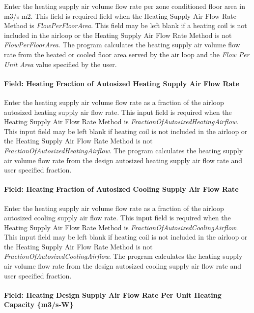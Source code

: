 Enter the heating supply air volume flow rate per zone conditioned floor area in m3/s-m2. This field is required field when the Heating Supply Air Flow Rate Method is \emph{FlowPerFloorArea}. This field may be left blank if a heating coil is not included in the airloop or the Heating Supply Air Flow Rate Method is not \emph{FlowPerFloorArea}. The program calculates the heating supply air volume flow rate from the heated or cooled floor area served by the air loop and the \emph{Flow Per Unit Area} value specified by the user.

\paragraph{Field: Heating Fraction of Autosized Heating Supply Air Flow Rate}\label{field-heating-fraction-of-autosized-heating-supply-air-flow-rate}

Enter the heating supply air volume flow rate as a fraction of the airloop autosized heating supply air flow rate. This input field is required when the Heating Supply Air Flow Rate Method is \emph{FractionOfAutosizedHeatingAirflow}. This input field may be left blank if heating coil is not included in the airloop or the Heating Supply Air Flow Rate Method is not \emph{FractionOfAutosizedHeatingAirflow}. The program calculates the heating supply air volume flow rate from the design autosized heating supply air flow rate and user specified fraction.

\paragraph{Field: Heating Fraction of Autosized Cooling Supply Air Flow Rate}\label{field-heating-fraction-of-autosized-cooling-supply-air-flow-rate}

Enter the heating supply air volume flow rate as a fraction of the airloop autosized cooling supply air flow rate. This input field is required when the Heating Supply Air Flow Rate Method is \emph{FractionOfAutosizedCoolingAirflow}. This input field may be left blank if heating coil is not included in the airloop or the Heating Supply Air Flow Rate Method is not \emph{FractionOfAutosizedCoolingAirflow}. The program calculates the heating supply air volume flow rate from the design autosized cooling supply air flow rate and user specified fraction.

\paragraph{Field: Heating Design Supply Air Flow Rate Per Unit Heating Capacity \{m3/s-W\}}\label{field-heating-design-supply-air-flow-rate-per-unit-heating-capacity-m3s-w-1}

